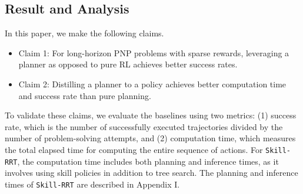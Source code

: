 






\subsection{Result and Analysis}

In this paper, we make the following claims.

\begin{itemize}
    \item Claim 1: For long-horizon PNP problems with sparse rewards, leveraging a planner as opposed to pure RL achieves better success rates.
    \item Claim 2: Distilling a planner to a policy achieves better computation time and success rate than pure planning.
\end{itemize}
To validate these claims, we evaluate the baselines using two metrics: (1) success rate, which is the number of successfully executed trajectories divided by the number of problem-solving attempts, and (2) computation time, which measures the total elapsed time for computing the entire sequence of actions. For \texttt{Skill-RRT}, the computation time includes both planning and inference times, as it involves using skill policies in addition to tree search. The planning and inference times of \texttt{Skill-RRT} are described in Appendix I.

